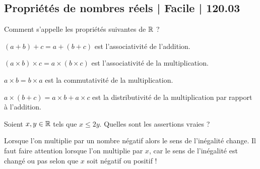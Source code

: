 \subsection{Propriétés de nombres réels | Facile | 120.03}



\begin{question}

Comment s'appelle les propriétés suivantes de $\mathbb{R}$ ?
\begin{answers}



\end{answers}
\begin{explanations}
$(a+b)+c=a+(b+c)$ est l'associativité de l'addition.

$(a \times b)\times c=a \times (b \times c)$ est l'associativité de la multiplication.

$a \times b = b\times a$ est la commutativité de la multiplication.

$a \times (b+c) = a\times b + a \times c$ est la distributivité de la multiplication  par rapport à l'addition.
\end{explanations}
\end{question}


\begin{question}

Soient $x,y \in \mathbb{R}$ tels que $x \le 2y$.
Quelles sont les assertions vraies ?
\begin{answers}



\end{answers}
\begin{explanations}
Lorsque l'on multiplie par un nombre négatif alors le sens de l'inégalité change. Il faut faire attention lorsque l'on multiplie par $x$, car le sens de l'inégalité est changé ou pas selon que $x$ soit négatif ou positif !
\end{explanations}
\end{question}


